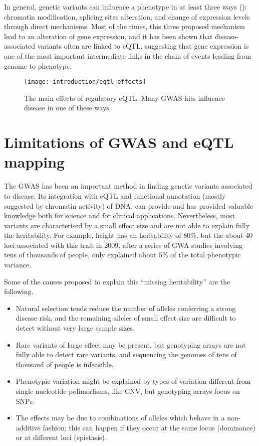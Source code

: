 \documentclass[../main.tex]{subfiles}
\begin{document}
In general, genetic variants can influence a phenotype in at least three 
ways (): chromatin modification, splicing sites 
alteration, and change of expression levels through direct 
mechanisms\autocite{Li2016}. Most of the times, this three proposed 
mechanism lead to an alteration of gene expression, and it has been 
shown that disease-associated variants often are linked to 
eQTL\autocite{Nicolae2010}, suggesting that gene expression is one of 
the most important intermediate links in the chain of events leading 
from genome to phenotype.

\begin{figure}
	\centering
	\texttt{[image: introduction/eqtl\_effects]}
	\caption{The main effects of regulatory eQTL. Many GWAS hits 
influence disease in one of these ways.}
\end{figure}

\section{Limitations of GWAS and eQTL mapping}

The GWAS has been an important method in finding genetic variants 
associated to disease. Its integration with eQTL and functional 
annotation (mostly suggested by chromatin activity) of DNA, can provide 
and has provided valuable knowledge both for science and for clinical 
applications. Nevertheless, most variants are characterised by a small 
effect size and are not able to explain fully the 
heritability\autocite{Manolio2009}. For example, height has an 
heritability of 80\%, but the about 40 loci associated with this trait 
in 2009, after a series of GWA studies involving tens of thousands of 
people, only explained about 5\% of the total phenotypic variance.

Some of the causes proposed to explain this \enquote{missing 
heritability} are the following\autocite{Manolio2009}.
\begin{itemize}
	\item Natural selection tends reduce the number of alleles 
		conferring a strong disease risk, and the remaining alleles of 
		small effect size are difficult to detect without very large 
		sample sizes.
	\item Rare variants of large effect may be present, but genotyping 
		arrays are not fully able to detect rare variants, and 
		sequencing the genomes of tens of thousand of people is 
		infeasible.
	\item Phenotypic variation might be explained by types of variation 
		different from single nucleotide polimorfisms, like CNV, but 
		genotyping arrays focus on SNPs.
	\item The effects may be due to combinations of alleles which behave 
		in a non-additive fashion; this can happen if they occur at the 
		same locus (dominance) or at different loci (epistasis).
\end{itemize}
\end{document}
